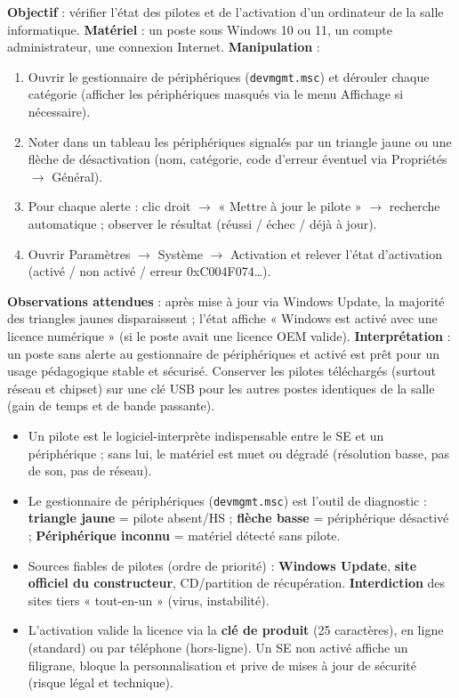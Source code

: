 \documentclass[11pt]{article}
\newcommand{\cle}[1]{{\popxbold\color{popdark}#1}}
\begin{document}
\begin{experience}
\textbf{Objectif} : vérifier l'état des pilotes et de l'activation d'un ordinateur de la salle informatique.
\textbf{Matériel} : un poste sous Windows 10 ou 11, un compte administrateur, une connexion Internet.
\textbf{Manipulation} :
\begin{enumerate}
  \item Ouvrir le gestionnaire de périphériques (\texttt{devmgmt.msc}) et dérouler chaque catégorie (afficher les périphériques masqués via le menu Affichage si nécessaire).
  \item Noter dans un tableau les périphériques signalés par un triangle jaune ou une flèche de désactivation (nom, catégorie, code d'erreur éventuel via Propriétés $\rightarrow$ Général).
  \item Pour chaque alerte : clic droit $\rightarrow$ « Mettre à jour le pilote » $\rightarrow$ recherche automatique ; observer le résultat (réussi / échec / déjà à jour).
  \item Ouvrir Paramètres $\rightarrow$ Système $\rightarrow$ Activation et relever l'état d'activation (activé / non activé / erreur 0xC004F074\ldots).
\end{enumerate}
\textbf{Observations attendues} : après mise à jour via Windows Update, la majorité des triangles jaunes disparaissent ; l'état affiche « Windows est activé avec une licence numérique » (si le poste avait une licence OEM valide).
\textbf{Interprétation} : un poste sans alerte au gestionnaire de périphériques et activé est prêt pour un usage pédagogique stable et sécurisé. Conserver les pilotes téléchargés (surtout réseau et chipset) sur une clé USB pour les autres postes identiques de la salle (gain de temps et de bande passante).
\end{experience}

\begin{aretenir}
\begin{itemize}
  \item Un \cle{pilote} est le logiciel-interprète indispensable entre le SE et un périphérique ; sans lui, le matériel est muet ou dégradé (résolution basse, pas de son, pas de réseau).
  \item Le \cle{gestionnaire de périphériques} (\texttt{devmgmt.msc}) est l'outil de diagnostic : \textbf{triangle jaune} = pilote absent/HS ; \textbf{flèche basse} = périphérique désactivé ; \textbf{Périphérique inconnu} = matériel détecté sans pilote.
  \item Sources fiables de pilotes (ordre de priorité) : \textbf{Windows Update}, \textbf{site officiel du constructeur}, CD/partition de récupération. \textbf{Interdiction} des sites tiers « tout-en-un » (virus, instabilité).
  \item L'\cle{activation} valide la licence via la \textbf{clé de produit} (25 caractères), en ligne (standard) ou par téléphone (hors-ligne). Un SE non activé affiche un filigrane, bloque la personnalisation et prive de mises à jour de sécurité (risque légal et technique).
\end{itemize}
\end{aretenir}
\end{document}
